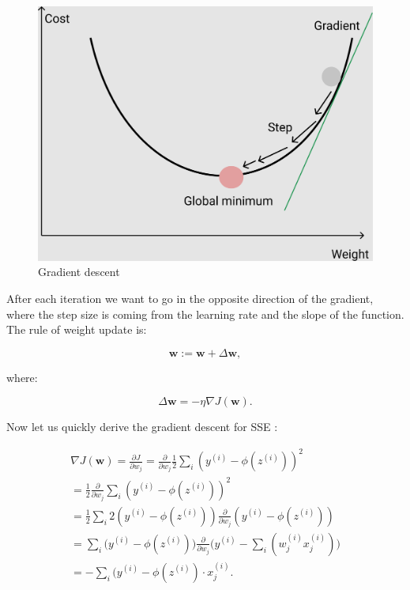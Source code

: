 \documentclass[a4paper,oneside,openright,11pt]{book}
\begin{document}
\begin{figure}[h]
\centering
\includegraphics[scale=0.15]{DocumentFigures/MyFigures/MyGradientDescent.png}
\caption{Gradient descent \cite{gradient}}
\end{figure}

After each iteration we want to go in the opposite direction of the gradient, where the step size is coming from the learning rate and the slope of the function. The rule of weight update is:

\begin{equation}
    \textbf{w} := \textbf{w} + \Delta \textbf{w},
\end{equation}

where:

\begin{equation}
    \Delta \textbf{w} = - \eta \nabla J(\textbf{w}).
\end{equation}

Now let us quickly derive the gradient descent for SSE \cite{raschka}:

\begin{equation}
\begin{aligned}
\nabla J(\textbf{w}) = \frac{\partial J}{\partial w_j} = \frac{\partial }{\partial w_j} \frac{1}{2} \sum_{i}^{}(y^{(i)} - \phi(z^{(i)}))^{2}  \\
       = \frac{1}{2} \frac{\partial }{\partial w_j} \sum_{i}^{}(y^{(i)} - \phi(z^{(i)}))^{2}  \\
      = \frac{1}{2}  \sum_{i}^{}2(y^{(i)} - \phi(z^{(i)}))\frac{\partial }{\partial w_j}(y^{(i)} - \phi(z^{(i)}))  \\
      = \sum_{i}^{}\big(y^{(i)} - \phi(z^{(i)})\big)\frac{\partial}{\partial w_{j}}\Big(y^{(i)} - \sum_{i}^{}(w_{j}^{(i)}x_{j}^{(i)}) \Big)\\
      = - \sum_{i}^{}(y^{(i)} - \phi(z^{(i)}) \cdot x_{j}^{(i)}.  
\end{aligned}
\end{equation}
\end{document}
